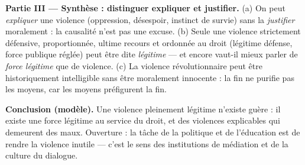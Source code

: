 \documentclass[11pt]{article}
\begin{document}
\begin{corrige}
\textbf{Partie III — Synthèse : distinguer expliquer et justifier.} (a) On peut \emph{expliquer} une violence (oppression, désespoir, instinct de survie) sans la \emph{justifier} moralement : la causalité n'est pas une excuse. (b) Seule une violence strictement défensive, proportionnée, ultime recours et ordonnée au droit (légitime défense, force publique réglée) peut être dite \emph{légitime} — et encore vaut-il mieux parler de \emph{force légitime} que de violence. (c) La violence révolutionnaire peut être historiquement intelligible sans être moralement innocente : la fin ne purifie pas les moyens, car les moyens préfigurent la fin.

\textbf{Conclusion (modèle).} Une violence pleinement légitime n'existe guère : il existe une force légitime au service du droit, et des violences explicables qui demeurent des maux. Ouverture : la tâche de la politique et de l'éducation est de rendre la violence inutile — c'est le sens des institutions de médiation et de la culture du dialogue.

\end{corrige}
\end{document}
